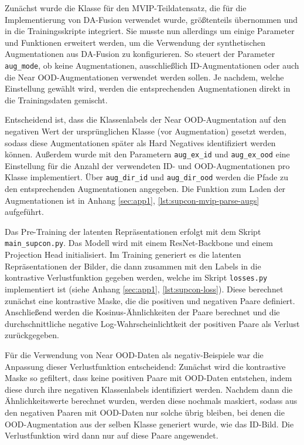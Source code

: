 Zunächst wurde die Klasse für den MVIP-Teildatensatz, die für die Implementierung von DA-Fusion verwendet wurde, größtenteils übernommen und in die Trainingsskripte integriert. Sie musste nun allerdings um einige Parameter und Funktionen erweitert werden, um die Verwendung der synthetischen Augmentationen aus DA-Fusion zu konfigurieren. So steuert der Parameter \lstinline{aug_mode}, ob keine Augmentationen, ausschließlich ID-Augmentationen oder auch die Near OOD-Augmentationen verwendet werden sollen. Je nachdem, welche Einstellung gewählt wird, werden die entsprechenden Augmentationen direkt in die Trainingsdaten gemischt. %

Entscheidend ist, dass die Klassenlabels der Near OOD-Augmentation auf den negativen Wert der ursprünglichen Klasse (vor Augmentation) gesetzt werden, sodass diese Augmentationen später als Hard Negatives identifiziert werden können. Außerdem wurde mit den Parametern \lstinline{aug_ex_id} und \lstinline{aug_ex_ood} eine Einstellung für die Anzahl der verwendeten ID- und OOD-Augmentationen pro Klasse implementiert. Über \lstinline{aug_dir_id} und \lstinline{aug_dir_ood} werden die Pfade zu den entsprechenden Augmentationen angegeben. Die Funktion zum Laden der Augmentationen ist in Anhang \ref{sec:app1}, \autoref{lst:supcon-mvip-parse-augs} aufgeführt.

Das Pre-Training der latenten Repräsentationen erfolgt mit dem Skript \lstinline{main_supcon.py}. Das Modell wird mit einem ResNet-Backbone und einem Projection Head initialisiert. Im Training generiert es die latenten Repräsentationen der Bilder, die dann zusammen mit den Labels in die kontrastive Verlustfunktion gegeben werden, welche im Skript \lstinline{losses.py} implementiert ist (siehe Anhang \ref{sec:app1}, \autoref{lst:supcon-loss}). Diese berechnet zunächst eine kontrastive Maske, die die positiven und negativen Paare definiert. Anschließend werden die Kosinus-Ähnlichkeiten der Paare berechnet und die durchschnittliche negative Log-Wahrscheinlichtkeit der positiven Paare als Verlust zurückgegeben.

Für die Verwendung von Near OOD-Daten als negativ-Beispiele war die Anpassung dieser Verlustfunktion entscheidend: Zunächst wird die kontrastive Maske so gefiltert, dass keine positiven Paare mit OOD-Daten entstehen, indem diese durch ihre negativen Klassenlabels identifiziert werden. Nachdem dann die Ähnlichkeitswerte berechnet wurden, werden diese nochmals maskiert, sodass aus den negativen Paaren mit OOD-Daten nur solche übrig bleiben, bei denen die OOD-Augmentation aus der selben Klasse generiert wurde, wie das ID-Bild. Die Verlustfunktion wird dann nur auf diese Paare angewendet.

